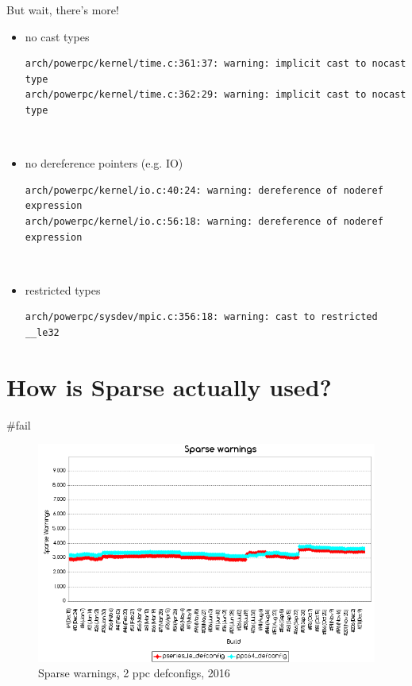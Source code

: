 \documentclass[pdf,aspectratio=169]{beamer}
\begin{document}
\begin{frame}[fragile]{But wait, there's more!}
\begin{itemize}
\item{no cast types}
{\small
\begin{verbatim}
arch/powerpc/kernel/time.c:361:37: warning: implicit cast to nocast type
arch/powerpc/kernel/time.c:362:29: warning: implicit cast to nocast type
\end{verbatim}}
~\
\item{no dereference pointers (e.g. IO)}
{\small
\begin{verbatim}
arch/powerpc/kernel/io.c:40:24: warning: dereference of noderef expression
arch/powerpc/kernel/io.c:56:18: warning: dereference of noderef expression
\end{verbatim}}
~\
\item{restricted types}
{\small
\begin{verbatim}
arch/powerpc/sysdev/mpic.c:356:18: warning: cast to restricted __le32
\end{verbatim}}
\end{itemize}
\end{frame}

\section{How is Sparse actually used?}
\label{sec-3}

\begin{frame}
\tableofcontents[currentsection]
\end{frame}

\begin{frame}{\#fail}
  \begin{figure}[h!]
    \centering
    \includegraphics[scale=0.4]{warnings-total-no-spike.png}
    \caption{Sparse warnings, 2 ppc defconfigs, 2016}
    \label{fig:sparse-warnings-no-spike}
  \end{figure}
\end{frame}
\end{document}

